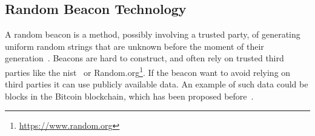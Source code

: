 \subsection{Random Beacon Technology}
A random beacon is a method, possibly involving a trusted party, of generating uniform random strings that are unknown before the moment of their generation~\cite{andrychowicz2014distributed}. Beacons are hard to construct, and often rely on trusted third parties like the \acrfull{nist}~\cite{nistbeacon} or Random.org\footnote{\url{https://www.random.org}}. If the beacon want to avoid relying on third parties it can use publicly available data. An example of such data could be blocks in the Bitcoin blockchain, which has been proposed before~\cite{bonneau2015bitcoin}.
